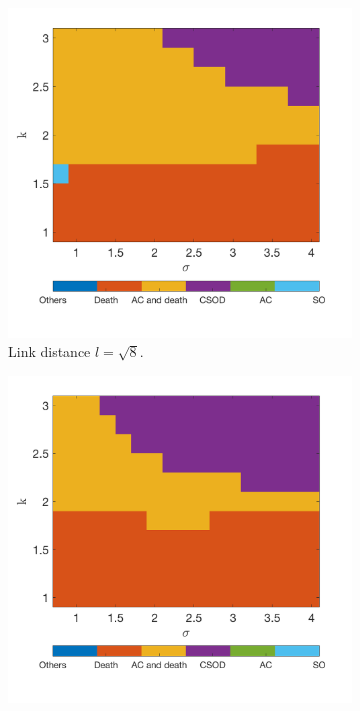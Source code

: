 \documentclass[12pt]{article}
\begin{document}
\begin{figure}[h]
\begin{subfigure}[b]{0.4\linewidth}
    \includegraphics[width=\textwidth]{Xinzhu Section/2dlat16_sqrt(8).png}
    \caption{Link distance $l=\sqrt{8}$.}
    \end{subfigure}
    \hfill
    \begin{subfigure}[b]{0.4\linewidth}
    \centering
    \includegraphics[width=\textwidth]{Xinzhu Section/2dlat16_sqrt(10).png}

\end{subfigure}
\end{figure}
\end{document}
